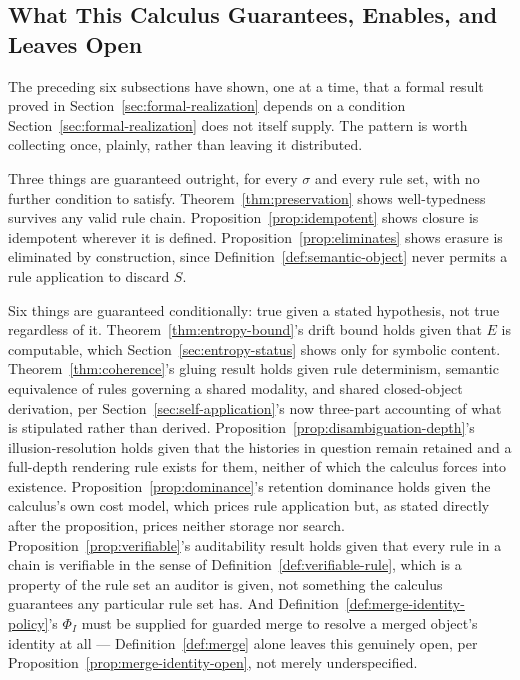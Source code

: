 \documentclass[11pt]{article}
\theoremstyle{definition}
\begin{document}
\subsection{What This Calculus Guarantees, Enables, and Leaves Open}
\label{sec:guarantees-summary}

The preceding six subsections have shown, one at a time, that a formal result proved in Section~\ref{sec:formal-realization} depends on a condition Section~\ref{sec:formal-realization} does not itself supply. The pattern is worth collecting once, plainly, rather than leaving it distributed.

Three things are guaranteed outright, for every $\sigma$ and every rule set, with no further condition to satisfy. Theorem~\ref{thm:preservation} shows well-typedness survives any valid rule chain. Proposition~\ref{prop:idempotent} shows closure is idempotent wherever it is defined. Proposition~\ref{prop:eliminates} shows erasure is eliminated by construction, since Definition~\ref{def:semantic-object} never permits a rule application to discard $S$.

Six things are guaranteed conditionally: true given a stated hypothesis, not true regardless of it. Theorem~\ref{thm:entropy-bound}'s drift bound holds given that $E$ is computable, which Section~\ref{sec:entropy-status} shows only for symbolic content. Theorem~\ref{thm:coherence}'s gluing result holds given rule determinism, semantic equivalence of rules governing a shared modality, and shared closed-object derivation, per Section~\ref{sec:self-application}'s now three-part accounting of what is stipulated rather than derived. Proposition~\ref{prop:disambiguation-depth}'s illusion-resolution holds given that the histories in question remain retained and a full-depth rendering rule exists for them, neither of which the calculus forces into existence. Proposition~\ref{prop:dominance}'s retention dominance holds given the calculus's own cost model, which prices rule application but, as stated directly after the proposition, prices neither storage nor search. Proposition~\ref{prop:verifiable}'s auditability result holds given that every rule in a chain is verifiable in the sense of Definition~\ref{def:verifiable-rule}, which is a property of the rule set an auditor is given, not something the calculus guarantees any particular rule set has. And Definition~\ref{def:merge-identity-policy}'s $\Phi_I$ must be supplied for guarded merge to resolve a merged object's identity at all --- Definition~\ref{def:merge} alone leaves this genuinely open, per Proposition~\ref{prop:merge-identity-open}, not merely underspecified.
\end{document}
